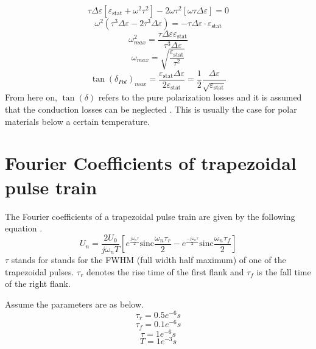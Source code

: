 \begin{equation}
\tau \Delta \varepsilon [\varepsilon_{\textrm{stat}} + \omega^2 \tau^2] -2\omega \tau^2 [\omega \tau \Delta \varepsilon] = 0
\end{equation}
\begin{equation}
\omega^2 (\tau^3 \Delta \varepsilon -2 \tau^3 \Delta \varepsilon) = - \tau \Delta \varepsilon \cdot \varepsilon_{\textrm{stat}}
\end{equation}
\begin{equation}
\omega_{max}^2 = \frac{\tau \Delta \varepsilon \varepsilon_{\textrm{stat}}}{\tau^3 \Delta \varepsilon}
\end{equation}
\begin{equation}
\omega_{max} = \sqrt{\frac{\varepsilon_{\textrm{stat}}}{\tau^2}}
\end{equation}
\begin{equation}
\tan(\delta_{Pol})_{max} = \frac{\varepsilon_{\textrm{stat}} \Delta\varepsilon}{2\varepsilon_{\textrm{stat}}} = \frac{1}{2} \frac{\Delta \varepsilon}{\sqrt{\varepsilon_{\textrm{stat}}}}
\end{equation}
From here on, $\tan(\delta)$ refers to the pure polarization losses and it is assumed that the conduction losses can be neglected . This is usually the case for polar materials below a certain temperature. 

\section{Fourier Coefficients of trapezoidal pulse  train }

The Fourier coefficients of a trapezoidal pulse train are given by the following equation \cite{}. 
\begin{equation}
 U_n = \frac{2 U_0}{j \omega_n T} [e^{\frac{j \omega_n \tau}{2}} \textrm{sinc}{\frac { \omega_n \tau_r }{2}} -e^{\frac{-j \omega_n \tau}{2}} \textrm{sinc}{\frac{ \omega_n \tau_f}{2}}]
\end{equation}
$\tau$ stands for stands for the FWHM (full width half maximum) of one of the trapezoidal pulses.
$\tau_r$ denotes the rise time of the first flank and $\tau_f$ is the fall time of the right flank.

Assume the parameters are as below.
\begin{equation}
\label{eg:taur}
 \tau_r = 0.5e^{-6 } s
  \end{equation}
  \begin{equation}
 \tau_f = 0.1e^{-6} s
  \end{equation}
 \begin{equation}
\tau= 1e^{-6} s
 \end{equation}
 \begin{equation}
 \label{eg:time}
  T=1e^{-3} s
 \end{equation}

